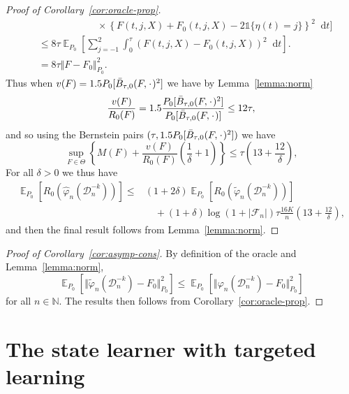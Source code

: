 \documentclass{statsoc}
\DeclareMathOperator{\E}{\mathbb{E}} %
\newcommand{\N}{\mathbb{N}}
\newcommand{\blank}{\makebox[1ex]{\textbf{$\cdot$}}}
\renewcommand{\phi}{\varphi}
\newcommand*\diff{\mathop{}\!\mathrm{d}}
\newcommand{\1}{\mathds{1}}
\newcommand{\data}{\ensuremath{\mathcal{D}}}
\begin{document}
\begin{proof}[Proof of Corollary~\ref{cor:oracle-prop}]
\begin{align*}
  & \quad \quad \quad\quad \quad \quad \times
    \left\{
    F(t, j, X) +  F_0(t, j, X)-2 \1{\{\eta(t) = j\}}
    \right\}^2
    \diff t 
    \Bigg]
  \\
  & \leq
    8\tau \E_{P_0}{\left[
    \sum_{j=-1}^{2} \int_0^{\tau}
    \left(
    F(t, j, X) - F_0(t, j, X)
    \right)^2
    \diff t 
    \right]}.
  \\
  & =
    8\tau \Vert F - F_0 \Vert_{P_0}^2.
\end{align*}
Thus when \( v(F) = 1.5 P_0{[\bar{B}_{\tau,0}(F, \blank)^2]} \) we have by
Lemma~\ref{lemma:norm}
\begin{equation*}
  \frac{v(F)}{R_0(F)}
  = 1.5 \frac{P_0{[\bar{B}_{\tau,0}(F, \blank)^2]}}{P_0{[\bar{B}_{\tau,0}(F, \blank)]}}
  \leq 12 \tau,
\end{equation*}
and so using the Bernstein pairs \( (\tau, 1.5 P_0{[\bar{B}_{\tau,0}(F, \blank)^2]}) \) we have
\begin{equation*}
  \sup_{F \in \Theta}
  \left\{
    M(F) + \frac{v(F)}{R_0(F)}
    \left(
      \frac{1}{\delta} + 1
    \right)
  \right\}
  \leq \tau
  \left(
    13 + \frac{12}{\delta}
  \right),
\end{equation*}
For all $\delta>0$ we thus have
\begin{align*}
  \E_{P_0}{\left[ R_0(\hat{\phi}_n(\data_n^{-k})) \right]}
  \leq
  &(1+2\delta)\E_{P_0}{\left[ R_0(\tilde{\phi}_n(\data_n^{-k})) \right]}
  \\
  & \quad
    + (1+\delta)\log(1 + |\mathcal{F}_n|) \tau \frac{16 K}{n}
    \left(
    13 + \frac{12}{\delta}
    \right),
\end{align*}
and then the final result follows from Lemma~\ref{lemma:norm}.
\end{proof}

\begin{proof}[Proof of Corollary~\ref{cor:asymp-cons}]
  By definition of the oracle and Lemma~\ref{lemma:norm},
  \begin{equation*}
    \E_{P_0}{\left[ \Vert \tilde{\phi}_n(\data_n^{-k}) - F_0 \Vert_{P_0}^2
      \right]} \leq \E_{P_0}{\left[ \Vert \phi_n(\data_n^{-k}) - F_0 \Vert_{P_0}^2
      \right]}  
  \end{equation*}
  for all \( n \in \N \). The results then follows from
  Corollary~\ref{cor:oracle-prop}.
\end{proof}


\section{The state learner with targeted learning}
\label{sec:state-learner-with}
\end{document}
